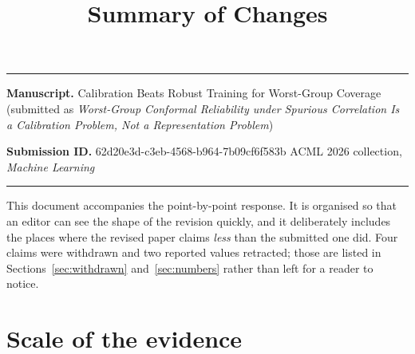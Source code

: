 \documentclass[11pt,a4paper]{article}
\title{\vspace{-1.6cm}\Large\bfseries Summary of Changes}
\date{}
\author{}
\begin{document}
\maketitle
\vspace{-2.2cm}

\noindent\textcolor{rulegrey}{\rule{\textwidth}{1pt}}

\textbf{Manuscript.} Calibration Beats Robust Training for Worst-Group Coverage
\quad(submitted as \emph{Worst-Group Conformal Reliability under Spurious Correlation Is a
Calibration Problem, Not a Representation Problem})

\textbf{Submission ID.} 62d20e3d-c3eb-4568-b964-7b09cf6f583b \quad ACML 2026 collection,
\emph{Machine Learning}

\noindent\textcolor{rulegrey}{\rule{\textwidth}{1pt}}

This document accompanies the point-by-point response. It is organised so that an editor can see
the shape of the revision quickly, and it deliberately includes the places where the revised paper
claims \emph{less} than the submitted one did. Four claims were withdrawn and two reported values
retracted; those are listed in Sections~\ref{sec:withdrawn} and~\ref{sec:numbers} rather than left
for a reader to notice.

\section{Scale of the evidence}
\end{document}

